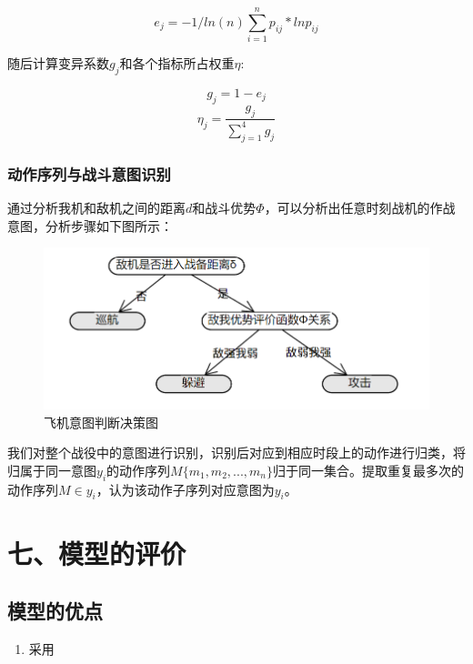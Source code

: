 \documentclass{my_paper}
\begin{document}
\begin{equation}
    e_j = -1/ln(n) \sum_{i=1}^{n} p_{ij}*ln p_{ij}
\end{equation}

随后计算变异系数$g_j$和各个指标所占权重$ \eta $:

\begin{equation}
    g_j = 1-e_j
\end{equation}
\begin{equation}
    \eta_j = \frac{g_j}{\sum_{j=1}^{4}g_j}
\end{equation}

\subsubsection{动作序列与战斗意图识别}

通过分析我机和敌机之间的距离$d$和战斗优势$\Phi$，可以分析出任意时刻战机的作战意图，分析步骤如下图所示：

\begin {figure}[h]
\centering %
\includegraphics[width=\textwidth]{yitu.png}
\caption{飞机意图判断决策图} %
\label{five}
\end {figure}

我们对整个战役中的意图进行识别，识别后对应到相应时段上的动作进行归类，将归属于同一意图$y_i$的动作序列$M\{m_1,m_2,...,m_n\}$归于同一集合。提取重复最多次的动作序列$M\in y_i$，认为该动作子序列对应意图为$y_i$。


\section{七、模型的评价}


\subsection{模型的优点}
\begin{enumerate}
    \item 采用

\end{enumerate}
\end{document}
